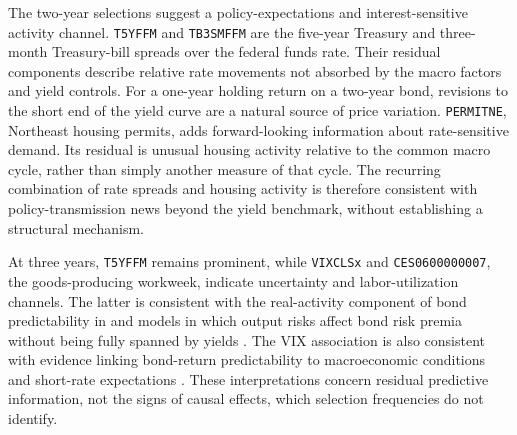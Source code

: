 \enlargethispage{\baselineskip}
The two-year selections suggest a policy-expectations and interest-sensitive
activity channel. \texttt{T5YFFM} and \texttt{TB3SMFFM} are the five-year
Treasury and three-month Treasury-bill spreads over the federal funds rate.
Their residual components describe relative rate movements not absorbed by
the macro factors and yield controls. For a one-year holding return on a
two-year bond, revisions to the short end of the yield curve are a natural
source of price variation. \texttt{PERMITNE}, Northeast housing permits,
adds forward-looking information about rate-sensitive demand. Its residual
is unusual housing activity relative to the common macro cycle, rather than
simply another measure of that cycle. The recurring combination of rate
spreads and housing activity is therefore consistent with policy-transmission
news beyond the yield benchmark, without establishing a structural mechanism.

At three years, \texttt{T5YFFM} remains prominent, while \texttt{VIXCLSx}
and \texttt{CES0600000007}, the goods-producing workweek, indicate uncertainty
and labor-utilization channels. The latter is consistent with the real-activity
component of bond predictability in \citet{LudvigsonNg2009} and models in which
output risks affect bond risk premia without being fully spanned by yields
\citep{JoslinPriebschSingleton2014}. The VIX association is also consistent
with evidence linking bond-return predictability to macroeconomic conditions
and short-rate expectations \citep{GarganoPettenuzzoTimmermann2019}.
These interpretations concern residual predictive information, not the signs
of causal effects, which selection frequencies do not identify.
